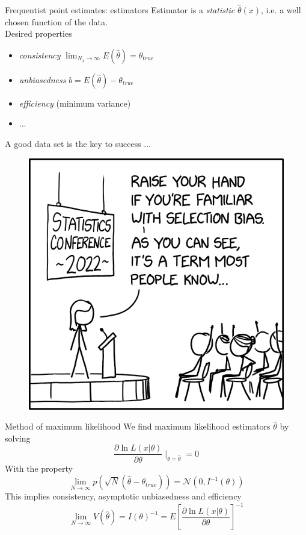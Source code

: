 \documentclass[
aspectratio=169,
14pt,
professionalfonts
]{beamer}
\begin{document}
\begin{frame}{Frequentist point estimates: estimators}
    Estimator is a \textit{statistic} $\hat \theta(x)$, i.e. a well chosen function of the data. \\
    Desired properties
    \begin{itemize}
        \item \textit{consistency} $\lim_{N_x \to \infty} E(\hat \theta) = \theta_{true}$
        \item \textit{unbiasedness} $b = E(\hat \theta) - \theta_{true}$
        \item \textit{efficiency} (minimum variance)
        \item ...
    \end{itemize}
\end{frame}

\begin{frame}{A good data set is the key to success ...}
\begin{figure}
    \centering
    \includegraphics[width=0.4\linewidth]{../plots/selection_bias_2x.png}
\end{figure}
\end{frame}

\begin{frame}{Method of maximum likelihood}
    We find maximum likelihood estimators $ \hat \theta$ by solving
    $$
    \frac{\partial \ln L(x|\theta)}{\partial \theta}\mid_{\theta = \hat \theta} = 0
    $$
    With the property
    $$
    \lim_{N \to \infty} p\left(\sqrt{N}(\hat \theta - \theta_{true})\right) = \mathcal{N}(0, I^{-1}(\theta))
    $$
    This implies consistency, asymptotic unbiasedness and efficiency
    $$ \lim_{N \to \infty} V(\hat \theta) = I(\theta)^{-1} = E\left[\frac{\partial \ln L(x|\theta)}{\partial \theta}\right]^{-1}$$
\end{frame}
\end{document}
